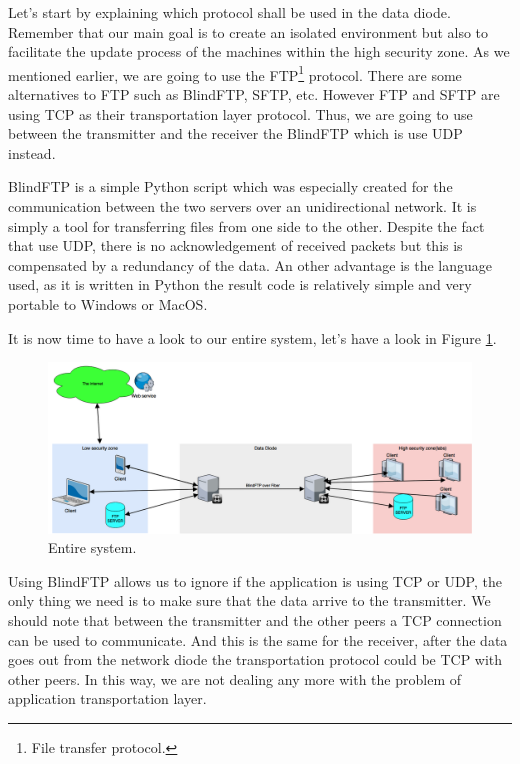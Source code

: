 \documentclass[a4paper,10pt]{article}
\begin{document}
Let's start by explaining which protocol shall be used in the data diode. Remember that our main goal is to create an isolated environment but also to facilitate the update process of the machines within the high security zone. As we mentioned earlier, we are going to use the FTP\footnote{File transfer protocol.} protocol. There are some alternatives to FTP such as BlindFTP, SFTP, etc. However FTP and SFTP are using TCP as their transportation layer protocol. Thus, we are going to use between the transmitter and the receiver the BlindFTP which is use UDP instead.

BlindFTP is a simple Python script which was especially created for the communication between the two servers over an unidirectional network. It is simply a tool for transferring files from one side to the other. Despite the fact that use UDP, there is no acknowledgement of received packets but this is compensated by a redundancy of the data. An other advantage is the language used, as it is written in Python the result code is relatively simple and very portable to Windows or MacOS.

It is now time to have a look to our entire system, let's have a look in Figure \ref{fig:sysschem}.\bigskip

\begin{figure}
\centering
\includegraphics[scale=0.35]{images/systemschema.png}
\caption{Entire system.}
\label{fig:sysschem}
\end{figure}

Using BlindFTP allows us to ignore if the application is using TCP or UDP, the only thing we need is to make sure that the data arrive to the transmitter. We should note that between the transmitter and the other peers a TCP connection can be used to communicate. And this is the same for the receiver, after the data goes out from the network diode the transportation protocol could be TCP with other peers. In this way, we are not dealing any more with the problem of application transportation layer. 
\end{document}
